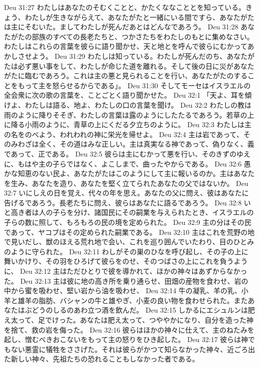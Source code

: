 Deu 31:27  わたしはあなたのそむくことと、かたくななこととを知っている。きょう、わたしが生きながらえて、あなたがたと一緒にいる間ですら、あなたがたは主にそむいた。ましてわたしが死んだあとはどんなであろう。
Deu 31:28  あなたがたの部族のすべての長老たちと、つかさたちをわたしのもとに集めなさい。わたしはこれらの言葉を彼らに語り聞かせ、天と地とを呼んで彼らにむかってあかしさせよう。
Deu 31:29  わたしは知っている。わたしが死んだのち、あなたがたは必ず悪い事をして、わたしが命じた道を離れる。そして後の日に災があなたがたに臨むであろう。これは主の悪と見られることを行い、あなたがたのすることをもって主を怒らせるからである」。
Deu 31:30  そしてモーセはイスラエルの全会衆に次の歌の言葉を、ことごとく語り聞かせた。
Deu 32:1  「天よ、耳を傾けよ、わたしは語る、地よ、わたしの口の言葉を聞け。
Deu 32:2  わたしの教は雨のように降りそそぎ、わたしの言葉は露のようにしたたるであろう。若草の上に降る小雨のように、青草の上にくだる夕立ちのように。
Deu 32:3  わたしは主の名をのべよう、われわれの神に栄光を帰せよ。
Deu 32:4  主は岩であって、そのみわざは全く、その道はみな正しい。主は真実なる神であって、偽りなく、義であって、正である。
Deu 32:5  彼らは主にむかって悪を行い、そのきずのゆえに、もはや主の子らではなく、よこしまで、曲ったやからである。
Deu 32:6  愚かな知恵のない民よ、あなたがたはこのようにして主に報いるのか。主はあなたを生み、あなたを造り、あなたを堅く立てられたあなたの父ではないか。
Deu 32:7  いにしえの日を覚え、代々の年を思え。あなたの父に問え、彼はあなたに告げるであろう。長老たちに問え、彼らはあなたに語るであろう。
Deu 32:8  いと高き者は人の子らを分け、諸国民にその嗣業を与えられたとき、イスラエルの子らの数に照して、もろもろの民の境を定められた。
Deu 32:9  主の分はその民であって、ヤコブはその定められた嗣業である。
Deu 32:10  主はこれを荒野の地で見いだし、獣のほえる荒れ地で会い、これを巡り囲んでいたわり、目のひとみのように守られた。
Deu 32:11  わしがその巣のひなを呼び起し、その子の上に舞いかけり、その羽をひろげて彼らをのせ、そのつばさの上にこれを負うように、
Deu 32:12  主はただひとりで彼を導かれて、ほかの神々はあずからなかった。
Deu 32:13  主は彼に地の高き所を乗り通らせ、田畑の産物を食わせ、岩の中から蜜を吸わせ、堅い岩から油を吸わせ、
Deu 32:14  牛の凝乳、羊の乳、小羊と雄羊の脂肪、バシャンの牛と雄やぎ、小麦の良い物を食わせられた。またあなたはぶどうのしるのあわ立つ酒を飲んだ。
Deu 32:15  しかるにエシュルンは肥え太って、足でけった。あなたは肥え太って、つややかになり、自分を造った神を捨て、救の岩を侮った。
Deu 32:16  彼らはほかの神々に仕えて、主のねたみを起し、憎むべきおこないをもって主の怒りをひき起した。
Deu 32:17  彼らは神でもない悪霊に犠牲をささげた。それは彼らがかつて知らなかった神々、近ごろ出た新しい神々、先祖たちの恐れることもしなかった者である。
